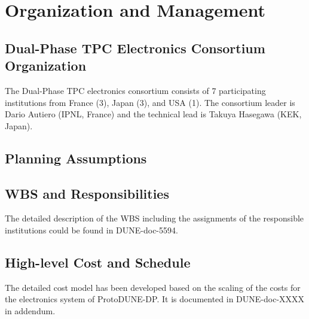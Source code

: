

\section{Organization and Management}
\label{sec:fddp-tpc-elec-org}

\subsection{Dual-Phase TPC Electronics Consortium Organization}
\label{sec:fddp-tpc-elec-org-consortium}

The Dual-Phase TPC electronics consortium consists of \num{7} participating institutions from France (\num{3}), Japan (\num{3}), and USA (\num{1}). The consortium leader is Dario Autiero (IPNL, France) and the technical lead is Takuya Hasegawa (KEK, Japan).

\subsection{Planning Assumptions}
\label{sec:fddp-tpc-elec-org-assmp}


\subsection{WBS and Responsibilities}
\label{sec:fddp-tpc-elec-org-wbs}

The detailed description of the WBS including the assignments of the responsible institutions could be found in DUNE-doc-5594.

\subsection{High-level Cost and Schedule}
\label{sec:fddp-tpc-elec-org-cs}

The detailed cost model has been developed based on the scaling of the costs for the electronics system of ProtoDUNE-DP. It is documented in DUNE-doc-XXXX in addendum.  
